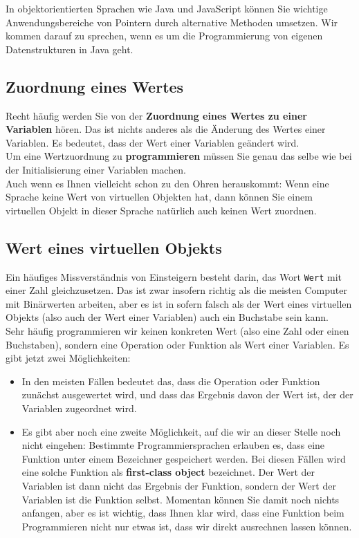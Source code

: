 In objektorientierten Sprachen wie Java und JavaScript können Sie wichtige Anwendungsbereiche von Pointern durch alternative Methoden umsetzen. Wir kommen darauf zu sprechen, wenn es um die Programmierung von eigenen Datenstrukturen in Java geht.\\

\subsection{Zuordnung eines Wertes}

Recht häufig werden Sie von der \textbf{Zuordnung eines Wertes zu einer Variablen} hören. Das ist nichts anderes als die Änderung des Wertes einer Variablen. Es bedeutet, dass der Wert einer Variablen geändert wird.\\

Um eine Wertzuordnung zu \textbf{programmieren} müssen Sie genau das selbe wie bei der Initialisierung einer Variablen machen.\\

Auch wenn es Ihnen vielleicht schon zu den Ohren herauskommt: Wenn eine Sprache keine Wert von virtuellen Objekten hat, dann können Sie einem virtuellen Objekt in dieser Sprache natürlich auch keinen Wert zuordnen.

\subsection{Wert eines virtuellen Objekts}

Ein häufiges Missverständnis von Einsteigern besteht darin, das Wort \verb|Wert| mit einer Zahl gleichzusetzen. Das ist zwar insofern richtig als die meisten Computer mit Binärwerten arbeiten, aber es ist in sofern falsch als der Wert eines virtuellen Objekts (also auch der Wert einer Variablen) auch ein Buchstabe sein kann.\\

Sehr häufig programmieren wir keinen konkreten Wert (also eine Zahl oder einen Buchstaben), sondern eine Operation oder Funktion als Wert einer Variablen. Es gibt jetzt zwei Möglichkeiten:

\begin{itemize}
	\item In den meisten Fällen bedeutet das, dass die Operation oder Funktion zunächst ausgewertet wird, und dass das \glqq{}Ergebnis\grqq{} davon der Wert ist, der der Variablen zugeordnet wird.
	\item Es gibt aber noch eine zweite Möglichkeit, auf die wir an dieser Stelle noch nicht eingehen: Bestimmte Programmiersprachen erlauben es, dass eine Funktion unter einem Bezeichner gespeichert werden. Bei diesen Fällen wird eine solche Funktion als \textbf{first-class object} bezeichnet. Der Wert der Variablen ist dann nicht das Ergebnis der Funktion, sondern der Wert der Variablen ist die Funktion selbst. Momentan können Sie damit noch nichts anfangen, aber es ist wichtig, dass Ihnen klar wird, dass eine Funktion beim Programmieren nicht nur etwas ist, dass wir direkt \glqq{}ausrechnen\grqq{} lassen können.
\end{itemize}

